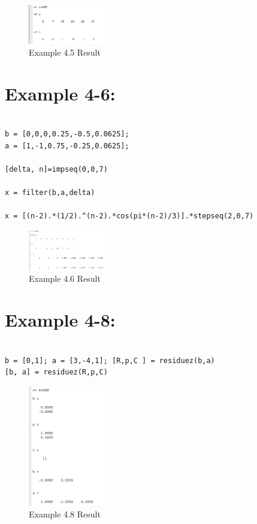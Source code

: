 \documentclass[11pt
  , a4paper
  , article
  , oneside
]{memoir}
\begin{document}
\clearpage

\begin{figure}[h!]
	\centering
	\includegraphics[width=0.3\textwidth,height=0.15\textwidth]{./images/ex405.png}
	\caption{Example 4.5 Result}
	\label{fig:Example 4.5 Result}
\end{figure}

\chapter{Example 4-6:}
\begin{lstlisting}[style=termstyle]
%Example 4.6

b = [0,0,0,0.25,-0.5,0.0625];
a = [1,-1,0.75,-0.25,0.0625];

[delta, n]=impseq(0,0,7) 

x = filter(b,a,delta)

x = [(n-2).*(1/2).^(n-2).*cos(pi*(n-2)/3)].*stepseq(2,0,7)
\end{lstlisting}

\begin{figure}[h!]
	\centering
	\includegraphics[width=0.3\textwidth,height=0.15\textwidth]{./images/ex406.png}
	\caption{Example 4.6 Result}
	\label{fig:Example 4.6 Result}
\end{figure}

\chapter{Example 4-8:}
\begin{lstlisting}[style=termstyle]
%Example 4.8

b = [0,1]; a = [3,-4,1]; [R,p,C ] = residuez(b,a)
[b, a] = residuez(R,p,C)
\end{lstlisting}

\begin{figure}[h!]
	\centering
	\includegraphics[width=0.3\textwidth,height=0.15\textwidth]{./images/ex408.png}
	\caption{Example 4.8 Result}
	\label{fig:Example 4.8 Result}
\end{figure}
\end{document}
